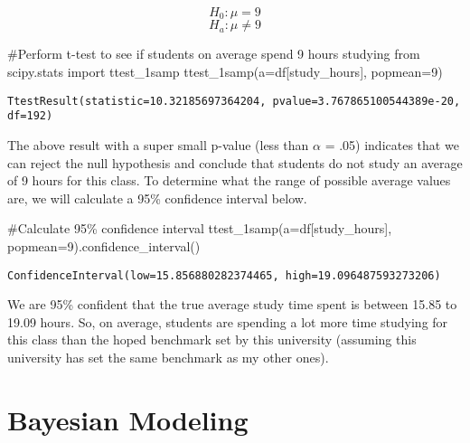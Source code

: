 \documentclass[
  letterpaper,
  DIV=11,
  numbers=noendperiod]{scrreprt}
\newenvironment{Shaded}{\begin{snugshade}}{\end{snugshade}}
\newcommand{\CommentTok}[1]{\textcolor[rgb]{0.37,0.37,0.37}{#1}}
\newcommand{\DecValTok}[1]{\textcolor[rgb]{0.68,0.00,0.00}{#1}}
\newcommand{\ImportTok}[1]{\textcolor[rgb]{0.00,0.46,0.62}{#1}}
\newcommand{\NormalTok}[1]{\textcolor[rgb]{0.00,0.23,0.31}{#1}}
\newcommand{\OperatorTok}[1]{\textcolor[rgb]{0.37,0.37,0.37}{#1}}
\newcommand{\StringTok}[1]{\textcolor[rgb]{0.13,0.47,0.30}{#1}}
\begin{document}
\[H_0: \mu = 9\] \[H_a: \mu \neq 9\]

\begin{Shaded}
\begin{Highlighting}[]
\CommentTok{\#Perform t{-}test to see if students on average spend 9 hours studying}
\ImportTok{from}\NormalTok{ scipy.stats }\ImportTok{import}\NormalTok{ ttest\_1samp}
\NormalTok{ttest\_1samp(a}\OperatorTok{=}\NormalTok{df[}\StringTok{\textquotesingle{}study\_hours\textquotesingle{}}\NormalTok{], popmean}\OperatorTok{=}\DecValTok{9}\NormalTok{)}
\end{Highlighting}
\end{Shaded}

\begin{verbatim}
TtestResult(statistic=10.32185697364204, pvalue=3.767865100544389e-20, df=192)
\end{verbatim}

The above result with a super small p-value (less than \(\alpha\) = .05)
indicates that we can reject the null hypothesis and conclude that
students do not study an average of 9 hours for this class. To determine
what the range of possible average values are, we will calculate a 95\%
confidence interval below.

\begin{Shaded}
\begin{Highlighting}[]
\CommentTok{\#Calculate 95\% confidence interval}
\NormalTok{ttest\_1samp(a}\OperatorTok{=}\NormalTok{df[}\StringTok{\textquotesingle{}study\_hours\textquotesingle{}}\NormalTok{], popmean}\OperatorTok{=}\DecValTok{9}\NormalTok{).confidence\_interval()}
\end{Highlighting}
\end{Shaded}

\begin{verbatim}
ConfidenceInterval(low=15.856880282374465, high=19.096487593273206)
\end{verbatim}

We are 95\% confident that the true average study time spent is between
15.85 to 19.09 hours. So, on average, students are spending a lot more
time studying for this class than the hoped benchmark set by this
university (assuming this university has set the same benchmark as my
other ones).

\hypertarget{bayesian-modeling}{%
\section{Bayesian Modeling}\label{bayesian-modeling}}
\end{document}
